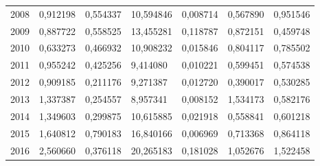 \begin{table}
\begin{tabular}{p{1cm}p{2cm}p{2cm}p{2cm}p{2cm}p{2cm}p{2cm}}
 2008 &                            0,912198 &                  0,554337 &                                   10,594846 &                        0,008714 &                    0,567890 &                                   0,951546 \\
 2009 &                            0,887722 &                  0,558525 &                                   13,455281 &                        0,118787 &                    0,872151 &                                   0,459748 \\
 2010 &                            0,633273 &                  0,466932 &                                   10,908232 &                        0,015846 &                    0,804117 &                                   0,785502 \\
 2011 &                            0,955242 &                  0,425256 &                                    9,414080 &                        0,010221 &                    0,599451 &                                   0,574538 \\
 2012 &                            0,909185 &                  0,211176 &                                    9,271387 &                        0,012720 &                    0,390017 &                                   0,530285 \\
 2013 &                            1,337387 &                  0,254557 &                                    8,957341 &                        0,008152 &                    1,534173 &                                   0,582176 \\
 2014 &                            1,349603 &                  0,299875 &                                   10,615885 &                        0,021918 &                    0,558841 &                                   0,601218 \\
 2015 &                            1,640812 &                  0,790183 &                                   16,840166 &                        0,006969 &                    0,713368 &                                   0,864118 \\
 2016 &                            2,560660 &                  0,376118 &                                   20,265183 &                        0,181028 &                    1,052676 &                                   1,522458 \\
\bottomrule
\end{tabular}
\end{table}
